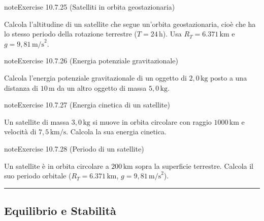 \documentclass[letterpaper,10pt,italian]{jupyterBook}
\begin{document}
\begin{sphinxadmonition}{note}{Exercise 10.7.25 (Satelliti in orbita geostazionaria)}



\sphinxAtStartPar
Calcola l’altitudine di un satellite che segue un’orbita geostazionaria, cioè che ha lo stesso periodo della rotazione terrestre (\(T = 24 \, \text{h}\)). Usa \(R_T = 6.371 \, \text{km}\) e \(g = 9,81 \, \text{m/s}^2\).
\end{sphinxadmonition}
 \label{exercise:ch/mechanics/dynamics-problems-exercise-25}

\begin{sphinxadmonition}{note}{Exercise 10.7.26 (Energia potenziale gravitazionale)}



\sphinxAtStartPar
Calcola l’energia potenziale gravitazionale di un oggetto di \(2,0 \, \text{kg}\) posto a una distanza di \(10 \, \text{m}\) da un altro oggetto di massa \(5,0 \, \text{kg}\).
\end{sphinxadmonition}
 \label{exercise:ch/mechanics/dynamics-problems-exercise-26}

\begin{sphinxadmonition}{note}{Exercise 10.7.27 (Energia cinetica di un satellite)}



\sphinxAtStartPar
Un satellite di massa \(3,0 \, \text{kg}\) si muove in orbita circolare con raggio \(1000 \, \text{km}\) e velocità di \(7,5 \, \text{km/s}\). Calcola la sua energia cinetica.
\end{sphinxadmonition}
 \label{exercise:ch/mechanics/dynamics-problems-exercise-27}

\begin{sphinxadmonition}{note}{Exercise 10.7.28 (Periodo di un satellite)}



\sphinxAtStartPar
Un satellite è in orbita circolare a \(200 \, \text{km}\) sopra la superficie terrestre. Calcola il suo periodo orbitale (\(R_T = 6.371 \, \text{km}\), \(g = 9,81 \, \text{m/s}^2\)).
\end{sphinxadmonition}


\bigskip\hrule\bigskip



\subsection{Equilibrio e Stabilità}
\label{\detokenize{ch/mechanics/dynamics-problems:equilibrio-e-stabilita}} \label{exercise:ch/mechanics/dynamics-problems-exercise-28}
\end{document}
